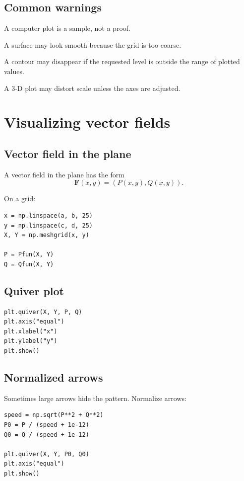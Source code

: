 \subsection*{Common warnings}

A computer plot is a sample, not a proof.

A surface may look smooth because the grid is too coarse.

A contour may disappear if the requested level is outside the range of plotted values.

A \(3\)-D plot may distort scale unless the axes are adjusted.

\section{Visualizing vector fields}
\label{app:G.2}

\subsection*{Vector field in the plane}

A vector field in the plane has the form
\[
\boxed{
    \mathbf F(x,y)=(P(x,y),Q(x,y)).
}
\]

On a grid:

\begin{verbatim}
x = np.linspace(a, b, 25)
y = np.linspace(c, d, 25)
X, Y = np.meshgrid(x, y)

P = Pfun(X, Y)
Q = Qfun(X, Y)
\end{verbatim}

\subsection*{Quiver plot}

\begin{verbatim}
plt.quiver(X, Y, P, Q)
plt.axis("equal")
plt.xlabel("x")
plt.ylabel("y")
plt.show()
\end{verbatim}

\subsection*{Normalized arrows}

Sometimes large arrows hide the pattern.  Normalize arrows:

\begin{verbatim}
speed = np.sqrt(P**2 + Q**2)
P0 = P / (speed + 1e-12)
Q0 = Q / (speed + 1e-12)

plt.quiver(X, Y, P0, Q0)
plt.axis("equal")
plt.show()
\end{verbatim}

